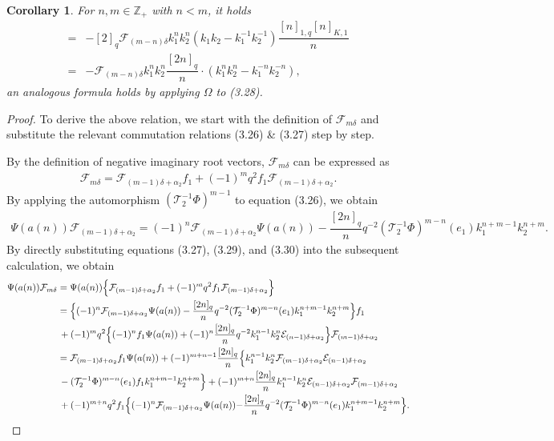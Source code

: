 \documentclass[12pt]{amsart}
\newtheorem{coro}[theorem]{Corollary}
\numberwithin{equation}{section}
\numberwithin{equation}{section}
\begin{document}
\begin{coro} 
For \(n,m\in\mathbb{Z}_{+}\) with \(n<m\), it holds
 \begin{align}  
[\Psi(a(n)), \mathcal{F}_{m\delta}]=&-[2]_q\mathcal{F}_{(m-n)\delta}k^n_1k^n_2(k_1k_2-k^{-1}_1k^{-1}_2)\dfrac{[n]_{1,q}[n]_{K,1}}{n}\nonumber\\
=&-\mathcal{F}_{(m-n)\delta}k^n_1k^n_2\dfrac{[2n]_q}{n} \cdot (k^n_1k^n_2 - k^{-n}_1k^{-n}_2),
\end{align} 
an analogous formula holds by applying \(\Omega\) to (3.28). 
\end{coro}
\begin{proof}
To derive the above relation, we start with the definition of \(\mathcal{F}_{m\delta}\)  and substitute the relevant commutation relations (3.26) \& (3.27) step by step.

By the definition of negative imaginary root vectors, \(\mathcal{F}_{m\delta}\) can be expressed as
\begin{align}
\mathcal{F}_{m\delta} = \mathcal{F}_{(m-1)\delta+\alpha_2}f_1 + (-1)^m q^2 f_1 \mathcal{F}_{(m-1)\delta+\alpha_2}.
\end{align}
By applying the automorphism \((\mathcal{T}^{-1}_2\Phi)^{m-1}\)  to equation (3.26), we obtain
\begin{align}
\Psi(a(n))\mathcal{F}_{(m-1)\delta+\alpha_2}
=(-1)^n\mathcal{F}_{(m-1)\delta+\alpha_2}\Psi(a(n))-\dfrac{[2n]_q}{n}q^{-2}(\mathcal{T}^{-1}_2\Phi)^{m-n}(e_1)k^{n+m-1}_1k^{n+m}_2.
\end{align}
By directly substituting equations (3.27), (3.29), and (3.30) into the subsequent calculation, we obtain
\begin{align*}
\Psi(a(n))\mathcal{F}_{m\delta} &=\Psi(a(n))\Bigl\{ \mathcal{F}_{(m-1)\delta+\alpha_2}f_1 + (-1)^m q^2 f_1 \mathcal{F}_{(m-1)\delta+\alpha_2} \Bigr\}\\
&=\Bigl\{(-1)^n\mathcal{F}_{(m-1)\delta+\alpha_2}\Psi(a(n))-\dfrac{[2n]_q}{n}q^{-2}(\mathcal{T}^{-1}_2\Phi)^{m-n}(e_1)k^{n+m-1}_1k^{n+m}_2\Bigr\}f_1\\
&\,+(-1)^mq^2\Bigl\{(-1)^{n}f_1\Psi(a(n)) +(-1)^n\frac{[2n]_q}{n} q^{-2} k_1^{n-1} k_2^n \mathcal{E}_{(n-1)\delta+\alpha_2}
\Bigr\}\mathcal{F}_{(m-1)\delta+\alpha_2}\\
&=\mathcal{F}_{(m-1)\delta+\alpha_2}f_1\Psi(a(n))+(-1)^{m+n-1}\dfrac{[2n]_q}{n}\Bigl\{k^{n-1}_1k^{n}_2\mathcal{F}_{(m-1)\delta+\alpha_2}\mathcal{E}_{(n-1)\delta+\alpha_2}\\
&\,-(\mathcal{T}^{-1}_2\Phi)^{m-n}(e_1)f_1k^{n+m-1}_1k^{n+m}_2\Bigr\}+ (-1)^{m+n} \frac{[2n]_q}{n} k_1^{n-1} k_2^{n}\mathcal{E}_{(n-1)\delta+\alpha_2} \mathcal{F}_{(m-1)\delta+\alpha_2}\\
&\,+({-}1)^{m+n}q^2f_1 \Bigl\{ ({-}1)^n \mathcal{F}_{(m-1)\delta+\alpha_2}\Psi(a(n)) {-} \frac{[2n]_q}{n} q^{-2} (\mathcal{T}_2^{-1}\Phi)^{m-n}(e_1) k_1^{n+m-1} k_2^{n+m} \Bigr\}.
\end{align*}


\end{proof}
\end{document}
